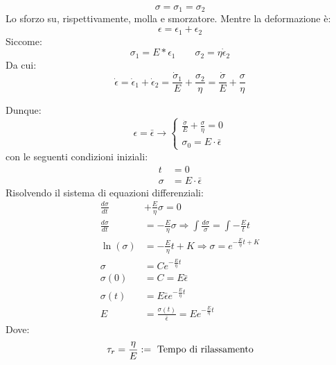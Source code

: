 \begin{equation}
\sigma = \sigma_1 = \sigma_2
\end{equation}
Lo sforzo su, rispettivamente, molla e smorzatore.
Mentre la deformazione è:
\begin{equation}
\epsilon = \epsilon_1 + \epsilon_2
\end{equation}
Siccome:
\begin{equation}
\sigma_1 = E*\epsilon_1 \qquad \sigma_2=\eta \dot{\epsilon}_2
\end{equation}
Da cui:
\begin{equation}
\dot{\epsilon} = \dot{\epsilon}_1 + \dot{\epsilon}_2 = \frac{\dot{\sigma}_1}{E} + \frac{\sigma_2}{\eta} = \frac{\dot{\sigma}}{E} + \frac{\sigma}{\eta}
\end{equation}

Dunque:
\begin{equation}
\epsilon = \bar{\epsilon} \rightarrow%
\begin{cases}
\frac{\dot{\sigma}}{E}+\frac{\sigma}{\eta} = 0\\
\sigma_0 = E \cdot \bar{\epsilon}
\end{cases}
\end{equation}
con le seguenti condizioni iniziali:
\begin{equation}
\begin{split}
t&=0\\
\sigma &= E \cdot \bar{\epsilon}
\end{split}
\end{equation}
Risolvendo il sistema di equazioni differenziali:
\begin{equation}
\begin{split}
\frac{d\sigma}{dt} &+ \frac{E}{\eta} \sigma = 0\\
\frac{d\sigma}{dt} &= -\frac{E}{\eta} \sigma \Rightarrow \int{\frac{d\sigma}{\sigma}} = \int{-\frac{E}{t}t}\\
\ln(\sigma)&= -\frac{E}{\eta}t + K \Rightarrow \sigma = e^{-\frac{E}{\eta}t+K}\\
\sigma &= C e^{-\frac{E}{\eta}t}\\
\sigma(0) &= C = E\bar{\epsilon}\\
\sigma(t) &= E\bar{\epsilon}e^{-\frac{E}{\eta}t}\\
E&= \frac{\sigma(t)}{\bar{\epsilon}}=Ee^{-\frac{E}{\eta}t}
\end{split}
\end{equation}
Dove:
\begin{equation}
\tau_r = \frac{\eta}{E} := \textup{ Tempo di rilassamento}
\end{equation}
